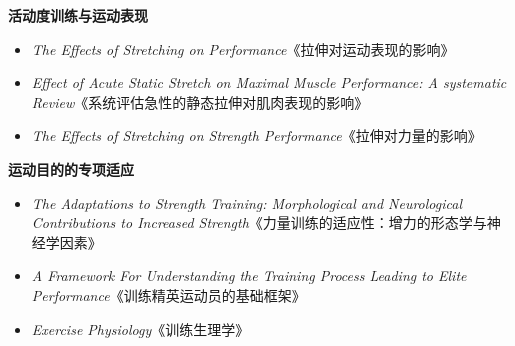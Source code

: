 \documentclass[fontset=fandol, a4paper, 12pt, openright]{ctexbook}
\begin{document}
\textbf{活动度训练与运动表现}
\begin{itemize}
    \item \textit{The Effects of Stretching on Performance}《拉伸对运动表现的影响》
    \item \textit{Effect of Acute Static Stretch on Maximal Muscle Performance: A systematic Review}《系统评估急性的静态拉伸对肌肉表现的影响》
    \item \textit{The Effects of Stretching on Strength Performance}《拉伸对力量的影响》
\end{itemize}

\textbf{运动目的的专项适应}
\begin{itemize}
    \item \textit{The Adaptations to Strength Training: Morphological and Neurological Contributions to Increased Strength}《力量训练的适应性：增力的形态学与神经学因素》
    \item \textit{A Framework For Understanding the Training Process Leading to Elite Performance}《训练精英运动员的基础框架》
    \item \textit{Exercise Physiology}《训练生理学》
\end{itemize}
\end{document}
